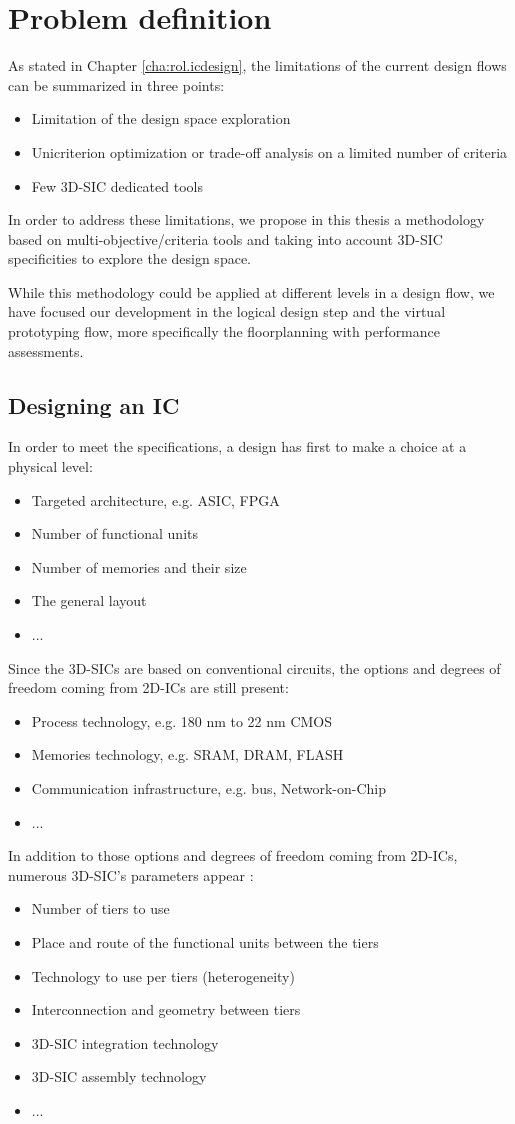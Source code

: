 \section{Problem definition}
As stated in Chapter \ref{cha:rol.icdesign}, the limitations of the current design flows can be summarized in three points:
\begin{itemize}
\item Limitation of the design space exploration
\item Unicriterion optimization or trade-off analysis on a limited number of criteria
\item Few 3D-SIC dedicated tools
\end{itemize}
In order to address these limitations, we propose in this thesis a methodology based on multi-objective/criteria tools and taking into account 3D-SIC specificities to explore the design space.

While this methodology could be applied at different levels in a design flow, we have focused our development in the logical design step and the virtual prototyping flow, more specifically the floorplanning with performance assessments.

\subsection{Designing an IC}
In order to meet the specifications, a design has first to make a choice at a physical level:
\begin{itemize}
\item Targeted architecture, e.g. ASIC, FPGA
\item Number of functional units
\item Number of memories and their size
\item The general layout
\item ...
\end{itemize}
Since the 3D-SICs are based on conventional circuits, the options and degrees of freedom coming from 2D-ICs are still present:
\begin{itemize}
\item Process technology, e.g. 180 nm to 22 nm CMOS
\item Memories technology, e.g. SRAM, DRAM, FLASH
\item Communication infrastructure, e.g. bus, Network-on-Chip
\item ...
\end{itemize}
In addition to those options and degrees of freedom coming from 2D-ICs, numerous 3D-SIC's parameters appear \cite{659500}:
\begin{itemize}
\item Number of tiers to use
\item Place and route of the functional units between the tiers
\item Technology to use per tiers (heterogeneity)
\item Interconnection and geometry between tiers
\item 3D-SIC integration technology
\item 3D-SIC assembly technology
\item ...
\end{itemize}


